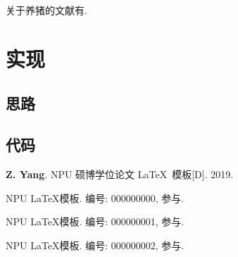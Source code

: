 \documentclass[twoside, UTF8, phd, AutoFakeBold]{nputhesis}
\theoremstyle{npuplain}
\theoremstyle{nputheorem}
\begin{document}
关于养猪的文献有\parencite{Zhang2019, Zhang2019a, Zhang2019b, Zhang2019c}.

\chapter{实现}
\section{思路}
\section{代码}

\backmatter
\printbibliography             %

\Appendix  %

\Thanks     %

\Work
\papersection  %

\begin{npulist}
  \item {\bf Z. Yang}. NPU 硕博学位论文 \LaTeX\ 模板[D]. 2019.
\end{npulist}

\researchsection %
\begin{npulist}
  \item NPU \LaTeX 模板.   编号: 000000000, 参与.
  \item NPU \LaTeX 模板.   编号: 000000001, 参与.
  \item NPU \LaTeX 模板.   编号: 000000002, 参与.
\end{npulist}

\statement
\end{document}
